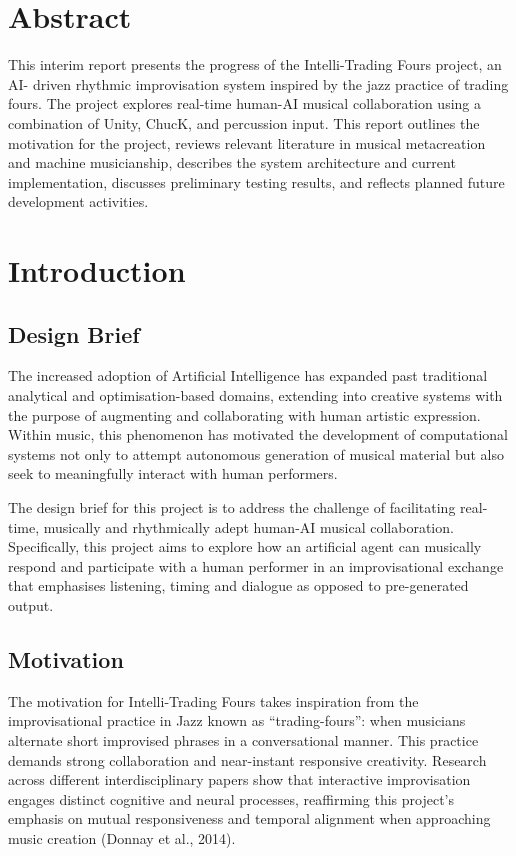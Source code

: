 \documentclass[11pt,a4paper]{article}
\begin{document}


\tableofcontents
\newpage

\section*{Abstract}
This interim report presents the progress of the Intelli-Trading Fours project, an AI-
driven rhythmic improvisation system inspired by the jazz practice of trading fours. The
project explores real-time human-AI musical collaboration using a combination of Unity,
ChucK, and percussion input. This report outlines the motivation for the project, reviews relevant literature in musical metacreation and machine musicianship, describes the system architecture and current implementation, discusses preliminary testing results, and reflects planned future development activities.

\section{Introduction}

\subsection{Design Brief}
The increased adoption of Artificial Intelligence has expanded past traditional analytical and optimisation-based domains, extending into creative systems with the purpose of augmenting and collaborating with human artistic expression. Within music, this phenomenon has motivated the development of computational systems not only to attempt autonomous generation of musical material but also seek to meaningfully interact with human performers.

The design brief for this project is to address the challenge of facilitating real-time, musically and rhythmically adept human-AI musical collaboration. Specifically, this project aims to explore how an artificial agent can musically respond and participate with a human performer in an improvisational exchange that emphasises listening, timing and dialogue as opposed to pre-generated output.

\subsection{Motivation}
The motivation for Intelli-Trading Fours takes inspiration from the improvisational practice in Jazz known as “trading-fours”: when musicians alternate short improvised phrases in a conversational manner. This practice demands strong collaboration and near-instant responsive creativity. Research across different interdisciplinary papers show that interactive improvisation engages distinct cognitive and neural processes, reaffirming this project’s emphasis on mutual responsiveness and temporal alignment when approaching music creation (Donnay et al., 2014).
\end{document}

